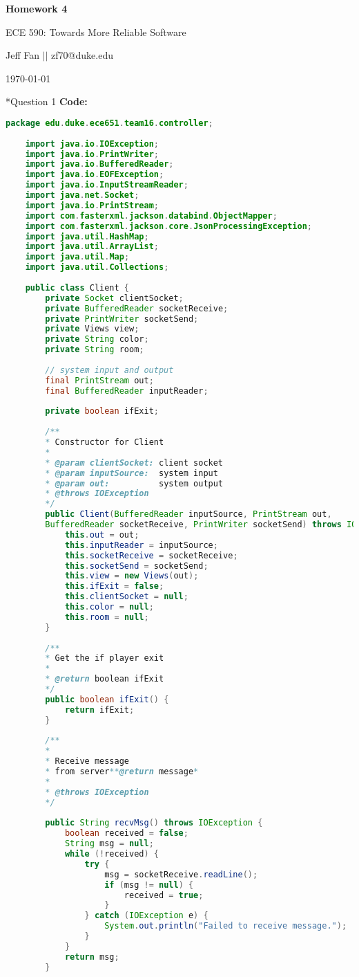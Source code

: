 \documentclass[12pt]{article}
\makeatletter
\numberwithin{table}{section}
\newcommand{\question}[2][]{\begin{flushleft}
		\Large\textbf{Question #1}: \large\textit{#2}
		
\end{flushleft}}
\newcommand{\maketitletwo}[2][]{\begin{center}
		\Large{\textbf{Homework #1}
			
			ECE 590: Towards More Reliable Software} %
		\vspace{5pt}
		
		\normalsize{Jeff Fan  \hspace{1em} $\left|\right|$ \hspace{1em}zf70@duke.edu  %
			
			\today}        %
		\vspace{15pt}
		
\end{center}}
\makeatother
\begin{document}
	\maketitletwo[4]  %
	
	\section*{Question 1} 
	\textbf{Code:}
	\begin{lstlisting}[language=Java]
	package edu.duke.ece651.team16.controller;
	
	import java.io.IOException;
	import java.io.PrintWriter;
	import java.io.BufferedReader;
	import java.io.EOFException;
	import java.io.InputStreamReader;
	import java.net.Socket;
	import java.io.PrintStream;
	import com.fasterxml.jackson.databind.ObjectMapper;
	import com.fasterxml.jackson.core.JsonProcessingException;
	import java.util.HashMap;
	import java.util.ArrayList;
	import java.util.Map;
	import java.util.Collections;
	
	public class Client {
		private Socket clientSocket;
		private BufferedReader socketReceive;
		private PrintWriter socketSend;
		private Views view;
		private String color;
		private String room;
		
		// system input and output
		final PrintStream out;
		final BufferedReader inputReader;
		
		private boolean ifExit;
		
		/**
		* Constructor for Client
		* 
		* @param clientSocket: client socket
		* @param inputSource:  system input
		* @param out:          system output
		* @throws IOException
		*/
		public Client(BufferedReader inputSource, PrintStream out,
		BufferedReader socketReceive, PrintWriter socketSend) throws IOException {
			this.out = out;
			this.inputReader = inputSource;
			this.socketReceive = socketReceive;
			this.socketSend = socketSend;
			this.view = new Views(out);
			this.ifExit = false;
			this.clientSocket = null;
			this.color = null;
			this.room = null;
		}
		
		/**
		* Get the if player exit
		* 
		* @return boolean ifExit
		*/
		public boolean ifExit() {
			return ifExit;
		}
		
		/**
		* 
		* Receive message
		* from server**@return message*
		* 
		* @throws IOException
		*/
		
		public String recvMsg() throws IOException {
			boolean received = false;
			String msg = null;
			while (!received) {
				try {
					msg = socketReceive.readLine();
					if (msg != null) {
						received = true;
					}
				} catch (IOException e) {
					System.out.println("Failed to receive message.");
				}
			}
			return msg;
		}
		

\end{lstlisting}
\end{document}
